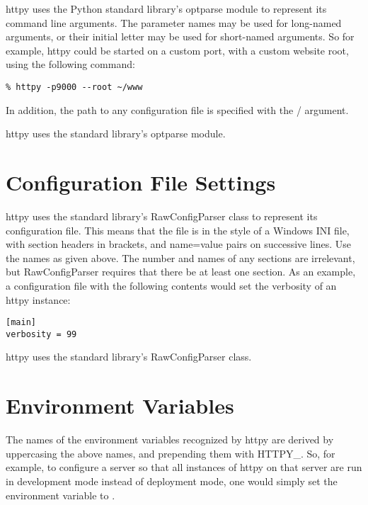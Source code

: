 httpy uses the Python standard library's optparse module to represent its
command line arguments. The parameter names may be used for long-named
arguments, or their initial letter may be used for short-named arguments. So for
example, httpy could be started on a custom port, with a custom website root,
using the following command:

\begin{verbatim}
% httpy -p9000 --root ~/www
\end{verbatim}

In addition, the path to any configuration file is specified with the
/ argument.

\begin{seealso}
          {httpy uses the standard library's optparse module.}
\end{seealso}




\section{Configuration File Settings}

httpy uses the standard library's RawConfigParser class to represent its
configuration file. This means that the file is in the style of a Windows INI
file, with section headers in brackets, and name=value pairs on successive
lines. Use the names as given above. The number and names of any sections are
irrelevant, but RawConfigParser requires that there be at least one section. As
an example, a configuration file with the following contents would set the
verbosity of an httpy instance:

\begin{verbatim}
[main]
verbosity = 99
\end{verbatim}

\begin{seealso}
          {httpy uses the standard library's RawConfigParser class.}
\end{seealso}




\section{Environment Variables}

The names of the environment variables recognized by httpy are derived by
uppercasing the above names, and prepending them with HTTPY_. So, for example,
to configure a server so that all instances of httpy on that server are run in
development mode instead of deployment mode, one would simply set the
environment variable  to .
